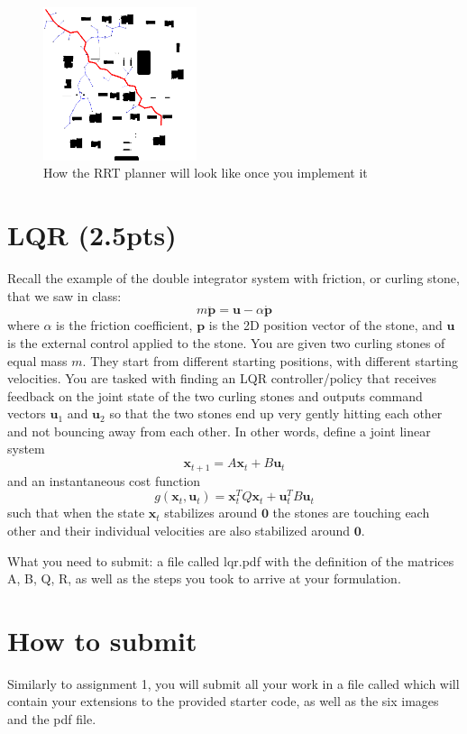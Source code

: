 \documentclass[a4paper,10pt]{article}
\begin{document}
\begin{figure}
  \begin{center}
    \includegraphics[width=0.4\textwidth]{rrt}
  \end{center}
  \caption{How the RRT planner will look like once you implement it}
\end{figure}

\section{LQR (2.5pts)}
Recall the example of the double integrator system with friction, or curling stone, that we saw in class:
\begin{equation}
m\ddot{\textbf{p}} = \textbf{u}-\alpha \dot{\textbf{p}} \nonumber
\end{equation}
\noindent where $\alpha$ is the friction coefficient, $\textbf{p}$ is the 2D position vector of the stone, and $\textbf{u}$ is the external control applied to the stone. 
You are given two curling stones of equal mass $m$. They start from different starting positions, with different starting velocities. You are tasked with finding an LQR 
controller/policy that receives feedback on the joint state of the two curling stones and outputs command vectors $\textbf{u}_1$ and $\textbf{u}_2$ so that the two stones 
end up very gently hitting each other and not bouncing away from each other. In other words, define a joint linear system 
\begin{equation}
  \textbf{x}_{t+1} = A\textbf{x}_t + B\textbf{u}_t
\end{equation}
\noindent and an instantaneous cost function
\begin{equation}
  g(\textbf{x}_t, \textbf{u}_t) = \textbf{x}^T_tQ\textbf{x}_t + \textbf{u}^T_tB\textbf{u}_t
\end{equation}
\noindent such that when the state $\textbf{x}_t$ stabilizes around $\textbf{0}$ the stones are touching each other and their individual velocities are also 
stabilized around $\textbf{0}$.

What you need to submit: a file called lqr.pdf with the definition of the matrices A, B, Q, R, as well as the steps you took to arrive at your formulation.    

\section{How to submit}
Similarly to assignment 1, you will submit all your work in a file called  which will contain
your extensions to the provided starter code, as well as the six images and the pdf file. 
\end{document}
